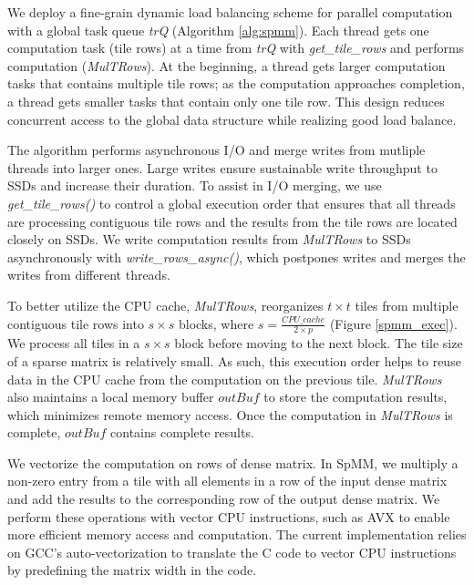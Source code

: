 We deploy a fine-grain dynamic load balancing scheme for parallel computation
with a global task queue \textit{trQ} (Algorithm \ref{alg:spmm}). Each thread
gets one computation task (tile rows) at a time from \textit{trQ} with
\textit{get\_tile\_rows} and performs computation (\textit{MulTRows}).
At the beginning, a thread gets larger computation tasks that contains multiple
tile rows; as the computation approaches completion, a thread gets smaller
tasks that contain only one tile row. This design reduces concurrent access to
the global data structure while realizing good load balance.

The algorithm performs asynchronous I/O and merge writes from mutliple threads
into larger ones. Large writes ensure sustainable write throughput to SSDs and
increase their duration. To assist in I/O merging, we use
\textit{get\_tile\_rows()} to control a global execution
order that ensures that all threads are processing contiguous tile rows and
the results from the tile rows are located closely on SSDs.
We write computation results from \textit{MulTRows} to SSDs
asynchronously with \textit{write\_rows\_async()}, which postpones writes and
merges the writes from different threads.


To better utilize the CPU cache, \textit{MulTRows}, 
reorganizes $t \times t$
tiles from multiple contiguous tile rows into $s \times s$ blocks, where
$s = \frac{CPU\_cache}{2 \times p}$ (Figure \ref{spmm_exec}). We process all
tiles in a $s \times s$ block before moving to the next block. The tile size
of a sparse matrix is relatively small. As such, this execution order helps to
reuse data in the CPU cache from the computation on the previous tile.
\textit{MulTRows} also maintains
a local memory buffer $outBuf$ to store the computation results,
which minimizes remote memory access. Once the computation in \textit{MulTRows}
is complete, $outBuf$ contains complete results.

We vectorize the computation on rows of dense matrix.
In SpMM, we multiply a non-zero entry from a tile with all elements in
a row of the input dense matrix and add the results to the corresponding row
of the output dense matrix.
We perform these operations with vector CPU instructions, such as
AVX \cite{avx} to enable more efficient memory access and computation.
The current implementation relies on GCC's auto-vectorization
to translate the C code to vector CPU instructions by predefining the matrix
width in the code.

